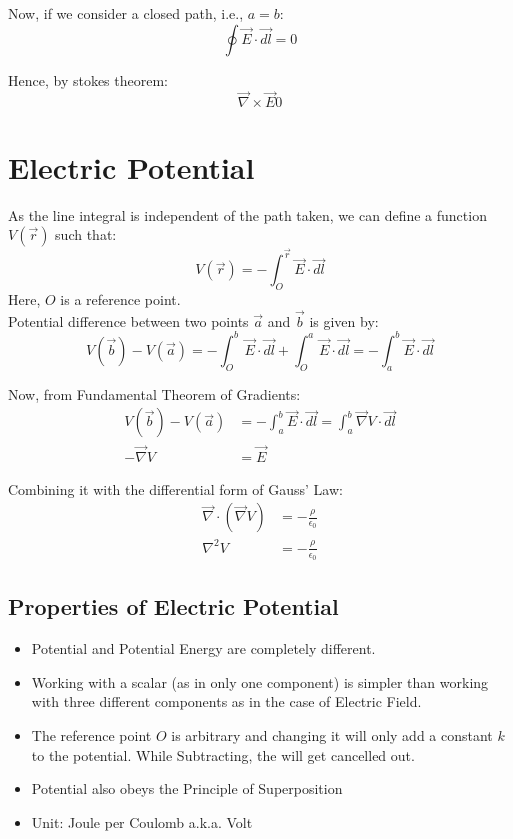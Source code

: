\documentclass{article}
\begin{document}
Now, if we consider a closed path, i.e., $a = b$:
\[ \oint \vec{E} \cdot \vec{dl} = 0 \]

Hence, by stokes theorem:
\[ \vec{\nabla} \times \vec{E} 0 \]

\section{Electric Potential}
As the line integral is independent of the path taken, we can define a function $V(\vec{r})$ such that:
\[ V(\vec{r}) = -\int_{O}^{\vec{r}} \vec{E}\cdot \vec{dl} \]
Here, $O$ is a reference point.\\

Potential difference between two points $\vec{a}$ and $\vec{b}$ is given by:
\[ V(\vec{b}) - V(\vec{a}) = -\int_{O}^{b} \vec{E} \cdot \vec{dl} + \int_{O}^{a} \vec{E} \cdot \vec{dl} =-\int_{a}^{b} \vec{E} \cdot \vec{dl} \]

Now, from Fundamental Theorem of Gradients:
\begin{align*}
    V(\vec{b}) - V(\vec{a}) &= - \int_{a}^{b} \vec{E} \cdot \vec{dl} = \int_{a}^{b} \vec{\nabla} V \cdot \vec{dl} \\
    - \vec{\nabla}V &= \vec{E}
\end{align*}

Combining it with the differential form of Gauss' Law:
\begin{align*}
    \vec{\nabla} \cdot \left(\vec{\nabla}V\right) &= -\frac{\rho}{\epsilon_0} \\
    \nabla^2 V &= -\frac{\rho}{\epsilon_0} 
\end{align*}

\subsection{Properties of Electric Potential}
\begin{itemize}
    \item Potential and Potential Energy are completely different. 
    \item Working with a scalar (as in only one component) is simpler than working with three different components as in the case of Electric Field.
    \item The reference point $O$ is arbitrary and changing it will only add a constant $k$ to the potential.
    While Subtracting, the will get cancelled out.
    \item Potential also obeys the Principle of Superposition
    \item Unit: Joule per Coulomb a.k.a. Volt
\end{itemize}
\end{document}
